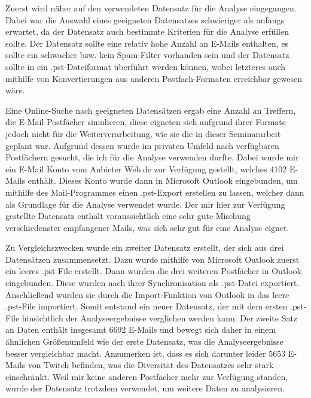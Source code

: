 \noindent Zuerst wird näher auf den verwendeten Datensatz für die Analyse eingegangen. Dabei war die Auswahl eines geeigneten Datensatzes schwieriger als anfangs erwartet, da der Datensatz auch bestimmte Kriterien für die Analyse erfüllen sollte. Der Datensatz sollte eine relativ hohe Anzahl an E-Mails enthalten, es sollte ein schwacher bzw. kein Spam-Filter vorhanden sein und der Datensatz sollte in ein .pst-Dateiformat überführt werden können, wobei letzteres auch mithilfe von Konvertierungen aus anderen Postfach-Formaten erreichbar gewesen wäre. \smallskip

\noindent Eine Online-Suche nach geeigneten Datensätzen ergab eine Anzahl an Treffern, die E-Mail-Postfächer simulieren, diese eigneten sich aufgrund ihrer Formate jedoch nicht für die Weiterverarbeitung, wie sie die in dieser Seminararbeit geplant war. Aufgrund dessen wurde im privaten Umfeld nach verfügbaren Postfächern gesucht, die ich für die Analyse verwenden durfte. Dabei wurde mir ein E-Mail Konto vom Anbieter \glqq{}Web.de\grqq{} zur Verfügung gestellt, welches 4102 E-Mails enthält. Dieses Konto wurde dann in Microsoft Outlook eingebunden, um mithilfe des Mail-Programmes einen .pst-Export erstellen zu lassen, welcher dann als Grundlage für die Analyse verwendet wurde. Der mir hier zur Verfügung gestellte Datensatz enthält voraussichtlich eine sehr gute Mischung verschiedenster empfangener Mails, was sich sehr gut für eine Analyse eignet. \smallskip

\noindent Zu Vergleichszwecken wurde ein zweiter Datensatz erstellt, der sich aus drei Datensätzen zusammensetzt. Dazu wurde mithilfe von Microsoft Outlook zuerst ein leeres .pst-File erstellt. Dann wurden die drei weiteren Postfächer in Outlook eingebunden. Diese wurden nach ihrer Synchronisation als .pst-Datei exportiert. Anschließend wurden sie durch die Import-Funktion von Outlook in das leere .pst-File importiert. Somit entstand ein neuer Datensatz, der mit dem ersten .pst-File hinsichtlich der Analyseergebnisse verglichen werden kann. Der zweite Satz an Daten enthält insgesamt 6692 E-Mails und bewegt sich daher in einem ähnlichen Größenumfeld wie der erste Datensatz, was die Analyseergebnisse besser vergleichbar macht. Anzumerken ist, dass es sich darunter leider 5653 E-Mails von \glqq{}Twitch\grqq{} befinden, was die Diversität des Datensatzes sehr stark einschränkt. Weil mir keine anderen Postfächer mehr zur Verfügung standen, wurde der Datensatz trotzdem verwendet, um weitere Daten zu analysieren.